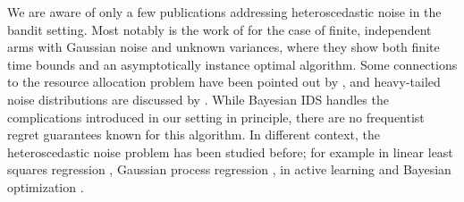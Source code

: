 We are aware of only a few publications addressing heteroscedastic noise in the bandit setting. Most notably is the work of \cite{CowanNormalBanditsUnknown2015} for the case of finite, independent arms with Gaussian noise and unknown variances, where they show both finite time bounds and an asymptotically instance optimal algorithm. Some connections to the resource allocation problem have been pointed out by \cite{LattimoreLinearMultiResourceAllocation2015}, and heavy-tailed noise distributions are discussed by \cite{LattimoreScaleFreeAlgorithm2017}. While Bayesian IDS handles the complications introduced in our setting in principle, there are no frequentist regret guarantees known for this algorithm. In different context, the heteroscedastic noise problem has been studied before; for example in linear least squares regression \cite[]{AitkenIVleastsquares1936},  Gaussian process regression \cite[]{GoldbergRegressionInputdependentNoise1998, KerstingMostLikelyHeteroscedastic2007}, in active learning \cite[]{AntosActivelearningheteroscedastic2010, ChaudhuriActiveHeteroscedasticRegression2017} and Bayesian optimization \citep{AssaelHeteroscedastictreedbayesian2014}.



